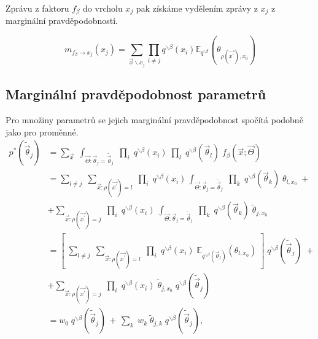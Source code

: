 Zprávu z faktoru $f_\beta$ do vrcholu $x_j$ pak získáme vydělením zprávy z $x_j$ z
marginální pravděpodobnosti.

\begin{equation}
m_{f_\beta \rightarrow x_j}(x_j) =
    \sum_{\vec{x} \backslash x_j}
        \prod_{i \ne j}
            q^{\backslash \beta}(x_i)
            \mathbb{E}_{q^{\backslash \beta}}
                (\theta_{\rho(\vec{x^\prime}), x_0})
\label{eq:msgfromftox}
\end{equation}

\subsection{Marginální pravděpodobnost parametrů}

Pro množiny parametrů se jejich marginální pravděpodobnost spočítá podobně jako
pro proměnné.
\begin{align}
p^*(\tilde{\vec{\theta}}_j) & = 
    \sum_{\vec{x}} \; 
    \int_{\vec{\Theta}: \vec{\theta}_j = \tilde{\vec{\theta}}_j} \;
         \prod_i \;
             q^{\backslash \beta}(x_i) \;
         \prod_l \;
    q^{\backslash \beta}(\vec{\theta}_l) \;
    f_\beta(\vec{x}; \vec{\Theta}) \label{eq:ep:theta_1}
\\
& = 
    \sum_{l \ne j} \;
        \sum_{\vec{x}: \rho(\vec{x^\prime}) = l} \;
            \prod_i \;
                q^{\backslash \beta}(x_i) \,
                \int_{\vec{\Theta}: \vec{\theta}_j = \tilde{\vec{\theta}}_j} \;
                    \prod_k \;
                        q^{\backslash \beta}(\vec{\theta}_k) \;
                        \theta_{l, x_0}\; + \label{eq:ep:theta_2}
\\
& + 
    \sum_{\vec{x}: \rho(\vec{x^\prime}) = j} \;
        \prod_i \;
            q^{\backslash \beta}(x_i) \;
            \int_{\vec{\Theta}: \vec{\theta}_j = \tilde{\vec{\theta}}_j} \;
                \prod_k \;
                    q^{\backslash \beta}(\vec{\theta}_k) \; 
                    \tilde{\theta}_{j, x_0}
\nonumber
\\
& = 
    \left[ \;
        \sum_{l \ne j} \;
            \sum_{\vec{x}: \rho(\vec{x^\prime}) = l} \;
                \prod_i \;
                    q^{\backslash \beta}(x_i) \;
                    \mathbb{E}_{q^{\backslash \beta}(\vec{\theta}_l)} (\theta_{l, x_0}) \;
    \right] \;
    q^{\backslash \beta}(\tilde{\vec{\theta}}_j) \; + \label{eq:ep:theta_3}
\\
& + 
    \sum_{\vec{x}: \rho(\vec{x^\prime}) = j} \;
        \prod_i \;
            q^{\backslash \beta}(x_i) \;
            \tilde{\theta}_{j,x_0} \;
            q^{\backslash \beta}(\tilde{\vec{\theta}}_j) \;
\label{eq:ep:theta_4}
\nonumber
\\
& = w_0 \; q^{\backslash \beta}(\tilde{\vec{\theta}}_j) \, + \, \sum_k \; w_k \;
    \tilde{\theta}_{j,k} \; q^{\backslash \beta}(\tilde{\vec{\theta}}_j),
\end{align}

